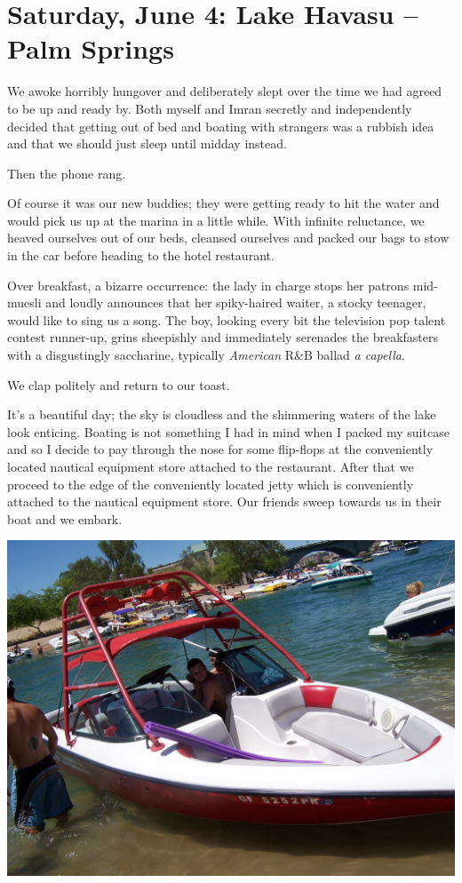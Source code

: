 \documentclass[a5paper,titlepage,11pt,draft]{book}
\begin{document}
\chapter[Lake Havasu -- Palm Springs]{Saturday, June 4:  Lake Havasu -- Palm Springs}
We awoke horribly hungover and deliberately slept over the time we had agreed to be up and ready by.  Both myself and Imran secretly and independently decided that getting out of bed and boating with strangers was a rubbish idea and that we should just sleep until midday instead.

Then the phone rang.

Of course it was our new buddies; they were getting ready to hit the water and would pick us up at the marina in a little while.  With infinite reluctance, we heaved ourselves out of our beds, cleansed ourselves and packed our bags to stow in the car before heading to the hotel restaurant.

Over breakfast, a bizarre occurrence:  the lady in charge stops her patrons mid-muesli and loudly announces that her spiky-haired waiter, a stocky teenager, would like to sing us a song.  The boy, looking every bit the television pop talent contest runner-up, grins sheepishly and immediately serenades the breakfasters with a disgustingly saccharine, typically \emph{American} R\&B ballad \emph{a capella}.

We clap politely and return to our toast.

It's a beautiful day; the sky is cloudless and the shimmering waters of the lake look enticing.  Boating is not something I had in mind when I packed my suitcase and so I decide to pay through the nose for some flip-flops at the conveniently located nautical equipment store attached to the restaurant.  After that we proceed to the edge of the conveniently located jetty which is conveniently attached to the nautical equipment store.  Our friends sweep towards us in their boat and we embark.

\begin{center}\includegraphics[width=\textwidth]{gfx/100_1606}\end{center}
\end{document}
